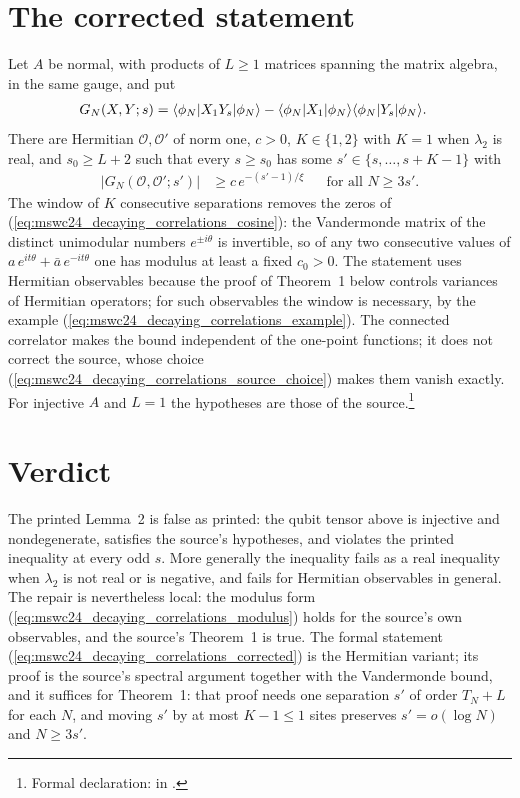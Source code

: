 \documentclass{article}
\begin{document}
\section{The corrected statement}
Let $A$ be normal, with products of $L\ge1$ matrices spanning the matrix
algebra, in the same gauge, and put
\begin{align}
    G_N(X,Y;s)
     & =\langle \phi_N|X_1Y_s|\phi_N\rangle
    -\langle \phi_N|X_1|\phi_N\rangle\langle \phi_N|Y_s|\phi_N\rangle.
    \label{eq:mswc24_decaying_correlations_connected}
\end{align}
There are Hermitian $\mathcal O,\mathcal O'$ of norm one, $c>0$,
$K\in\{1,2\}$ with $K=1$ when $\lambda_2$ is real, and $s_0\ge L+2$ such that
every $s\ge s_0$ has some $s'\in\{s,\dots,s+K-1\}$ with
\begin{align}
    \bigl\lvert G_N(\mathcal O,\mathcal O';s')\bigr\rvert
     & \ge c\,e^{-(s'-1)/\xi}
     &
     & \text{for all } N\ge3s'.
    \label{eq:mswc24_decaying_correlations_corrected}
\end{align}
The window of $K$ consecutive separations removes the zeros of
(\ref{eq:mswc24_decaying_correlations_cosine}): the Vandermonde matrix of the
distinct unimodular numbers $e^{\pm i\theta}$ is invertible, so of any two
consecutive values of $a\,e^{it\theta}+\bar a\,e^{-it\theta}$ one has modulus
at least a fixed $c_0>0$. The statement uses Hermitian observables because
the proof of Theorem~1 below controls variances of Hermitian operators; for
such observables the window is necessary, by the example
(\ref{eq:mswc24_decaying_correlations_example}). The connected correlator
makes the bound independent of the one-point functions; it does not correct
the source, whose choice
(\ref{eq:mswc24_decaying_correlations_source_choice}) makes them vanish
exactly. For injective $A$ and $L=1$ the hypotheses are those of the source.\footnote{Formal declaration:
     in
    .}

\section{Verdict}
The printed Lemma~2 is false as printed: the qubit tensor above is injective
and nondegenerate, satisfies the source's hypotheses, and violates the printed
inequality at every odd $s$. More generally the inequality fails as a real
inequality when $\lambda_2$ is not real or is negative, and fails for Hermitian
observables in general. The repair is nevertheless local: the modulus form (\ref{eq:mswc24_decaying_correlations_modulus}) holds
for the source's own observables, and the source's Theorem~1 is true. The
formal statement (\ref{eq:mswc24_decaying_correlations_corrected}) is the
Hermitian variant; its proof is the source's spectral argument together with
the Vandermonde bound, and it suffices for Theorem~1: that proof needs one
separation $s'$ of order $T_N+L$ for each $N$, and moving $s'$ by at most
$K-1\le1$ sites preserves $s'=o(\log N)$ and $N\ge3s'$.
\end{document}
